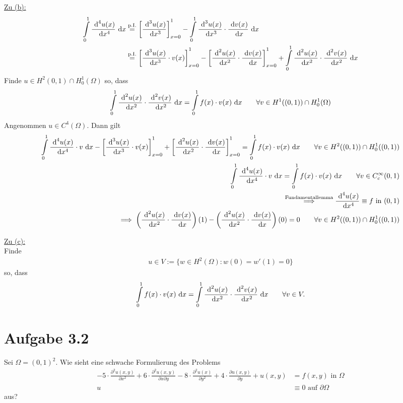 \documentclass[12pt,a4paper]{article}
\begin{document}
\begin{lösung}
\underline{Zu (b):}
\begin{align*}
\int\limits_0^1 \frac{\text{ d}^4 u(x)}{\text{ d} x^4}\text{ d} x
&\stackrel{\text{p.I.}}{=}
\left[\frac{\text{ d}^3 u(x)}{\text{ d} x^3}\right]_{x=0}^1-\int\limits_0^1 \frac{\text{ d}^3 u(x)}{\text{ d} x^3}\cdot\frac{\text{ d} v(x)}{\text{ d} x}\text{ d} x\\
&\stackrel{\text{p.I.}}{=}
\left[\frac{\text{ d}^3 u(x)}{\text{ d} x^3}\cdot v(x)\right]_{x=0}^1- 
\left[\frac{\text{ d}^2 u(x)}{\text{ d} x^2}\cdot\frac{\text{ d} v(x)}{\text{ d} x}\right]_{x=0}^1
+\int\limits_0^1 \frac{\text{ d}^2 u(x)}{\text{ d} x^2}\cdot\frac{\text{ d}^2 v(x)}{\text{ d} x^2}\text{ d} x\\
\end{align*}
Finde $u\in H^2(0,1)\cap H^1_0(\Omega)$ so, dass
\begin{align*}
\int\limits_0^1 \frac{\text{ d}^2 u(x)}{\text{ d} x^2}\cdot\frac{\text{ d}^2 v(x)}{\text{ d} x^2}\text{ d} x=\int\limits_0^1 f(x)\cdot v(x)\text{ d} x\qquad\forall v\in H^1((0,1))\cap H^1_0(\Omega)
\end{align*}
Angenommen $u\in C^4(\Omega)$. Dann gilt
\begin{align*}
\int\limits_0^1 \frac{\text{ d}^4 u(x)}{\text{ d} x^4}\cdot v\text{ d} x-\left[\frac{\text{ d}^3 u(x)}{\text{ d} x^3}\cdot v(x)\right]_{x=0}^1+\left[\frac{\text{ d}^2 u(x)}{\text{ d} x^2}\cdot\frac{\text{ d} v(x)}{\text{ d} x}\right]_{x=0}^1=\int\limits_0^1 f(x)\cdot v(x)\text{ d} x
\qquad\forall v\in H^2((0,1))\cap H_0^1((0,1))\\
\int\limits_0^1 \frac{\text{ d}^4 u(x)}{\text{ d} x^4}\cdot v\text{ d} x
=\int\limits_0^1 f(x)\cdot v(x)\text{ d} x\qquad\forall v\in C_c^\infty(0,1)\\
\stackrel{\text{Fundamentallemma}}{\implies}
\frac{\text{ d}^4 u(x)}{\text{ d} x^4}\equiv f\text{ in }(0,1)\\
\implies
\left(\frac{\text{ d}^2 u(x)}{\text{ d} x^2}\cdot\frac{\text{ d} v(x)}{\text{ d} x}\right)(1)-\left(\frac{\text{ d}^2 u(x)}{\text{ d} x^2}\cdot\frac{\text{ d} v(x)}{\text{ d} x}\right)(0)=0\qquad\forall v\in H^2((0,1))\cap H^1_0((0,1))
\end{align*}

\underline{Zu (c):}\\
Finde
\begin{align*}
u\in V:=\big\lbrace w\in H^2(\Omega):w(0)=w'(1)=0\big\rbrace
\end{align*}
so, dass
\begin{align*}
\int\limits_0^1 f(x)\cdot v(x)\text{ d} x=\int\limits_0^1\frac{\text{ d}^2 u(x)}{\text{ d} x^2}\cdot\frac{\text{ d}^2 v(x)}{\text{ d} x^2}\text{ d} x\qquad\forall v\in V.
\end{align*}
\end{lösung}

\section*{Aufgabe 3.2}
Sei $\Omega=(0,1)^2$. Wie sieht eine schwache Formulierung des Problems
\begin{align*}
-5\cdot\frac{\partial^2 u(x,y)}{\partial x^2}+6\cdot\frac{\partial^2 u(x,y)}{\partial x\partial y}-8\cdot\frac{\partial^2 u(x)}{\partial y^2}+4\cdot\frac{\partial u(x,y)}{\partial y}+u(x,y)&=f(x,y) \text{ in }\Omega\\
u&\equiv 0\text{ auf }\partial\Omega
\end{align*}
aus?
\end{document}
